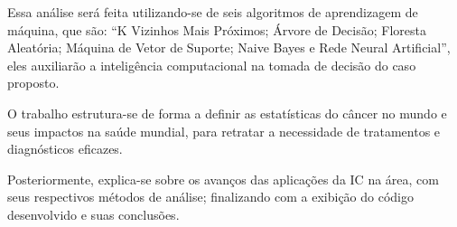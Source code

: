 Essa análise será feita utilizando-se de seis algoritmos de aprendizagem de máquina, que são: “K Vizinhos Mais Próximos;
Árvore de Decisão; Floresta Aleatória; Máquina de Vetor de Suporte; Naive Bayes e Rede Neural Artificial”,
eles auxiliarão a inteligência computacional na tomada de decisão do caso proposto.

O trabalho estrutura-se de forma a definir as estatísticas do câncer no mundo e seus impactos na saúde mundial,
para retratar a necessidade de tratamentos e diagnósticos eficazes.

Posteriormente, explica-se sobre os avanços das aplicações da IC na área, com seus respectivos métodos de análise;
finalizando com a exibição do código desenvolvido e suas conclusões.
















